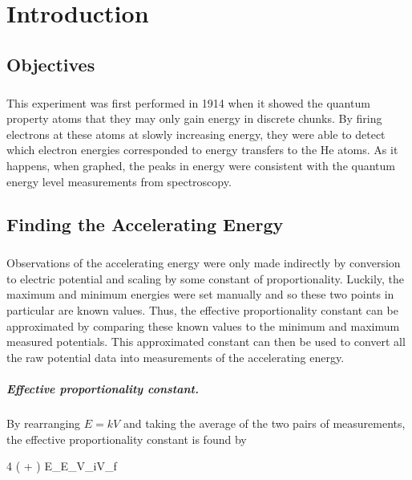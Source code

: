 \chapter{Introduction}

\section{Objectives}
\paragraph{}
This experiment was first performed in 1914 when it showed the quantum property atoms that they may only gain energy in discrete chunks. By firing electrons at these atoms at slowly increasing energy, they were able to detect which electron energies corresponded to energy transfers to the He atoms. As it happens, when graphed, the peaks in energy were consistent with the quantum energy level measurements from spectroscopy.

\section{Finding the Accelerating Energy}
\paragraph{}
Observations of the accelerating energy were only made indirectly by conversion to electric potential and scaling by some constant of proportionality. Luckily, the maximum and minimum energies were set manually and so these two points in particular are known values. Thus, the effective proportionality constant can be approximated by comparing these known values to the minimum and maximum measured potentials. This approximated constant can then be used to convert all the raw potential data into measurements of the accelerating energy.

\paragraph{Effective proportionality constant.}
By rearranging $E = kV$ and taking the average of the two pairs of measurements, the effective proportionality constant is found by

{4}{ \left( + \right)}
{{E_}{E_}{V_i}{V_f}}

